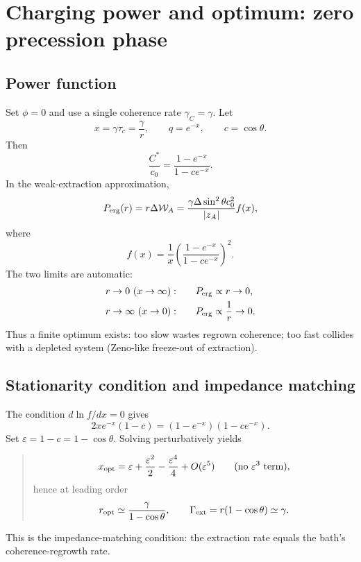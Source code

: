 \documentclass[11pt,a4paper]{article}
\newcommand{\W}{\mathcal{W}}
\newcommand{\eps}{\varepsilon}
\newenvironment{resultbox}{\begin{quote}\small\color{blue!40!black}}{\end{quote}}
\begin{document}
\section{Charging power and optimum: zero precession phase}\label{sec:power0}

\subsection{Power function}

Set $\phi=0$ and use a single coherence rate $\gamma_C=\gamma$. Let
\begin{equation}
x=\gamma\tau_c=\frac{\gamma}{r},
\qquad
q=e^{-x},
\qquad
c=\cos\theta.
\end{equation}
Then
\begin{equation}
\frac{C^*}{c_0}=\frac{1-e^{-x}}{1-ce^{-x}}.
\end{equation}
In the weak-extraction approximation,
\begin{equation}
P_{\rm erg}(r)=r\Delta\W_A
=\frac{\gamma\Delta\sin^2\theta c_0^2}{|z_A|}f(x),
\end{equation}
where
\begin{equation}
f(x)=\frac1x\left(\frac{1-e^{-x}}{1-ce^{-x}}\right)^2.
\end{equation}
The two limits are automatic:
\begin{align}
r\to0\ (x\to\infty):&\qquad P_{\rm erg}\propto r\to0,\\
r\to\infty\ (x\to0):&\qquad P_{\rm erg}\propto \frac1r\to0.
\end{align}
Thus a finite optimum exists: too slow wastes regrown coherence; too fast collides with a depleted system (Zeno-like freeze-out of extraction).

\subsection{Stationarity condition and impedance matching}

The condition $d\ln f/dx=0$ gives
\begin{equation}
2xe^{-x}(1-c)=(1-e^{-x})(1-ce^{-x}).
\end{equation}
Set $\eps=1-c=1-\cos\theta$. Solving perturbatively yields
\begin{resultbox}
\begin{equation}
x_{\rm opt}=\eps+\frac{\eps^2}{2}-\frac{\eps^4}{4}+O(\eps^5)
\qquad\text{(no $\eps^3$ term)},
\end{equation}
hence at leading order
\begin{equation}
r_{\rm opt}\simeq\frac{\gamma}{1-\cos\theta},
\qquad
\Gamma_{\rm ext}=r(1-\cos\theta)\simeq\gamma.
\end{equation}
\end{resultbox}
This is the impedance-matching condition: the extraction rate equals the bath's coherence-regrowth rate.
\end{document}
